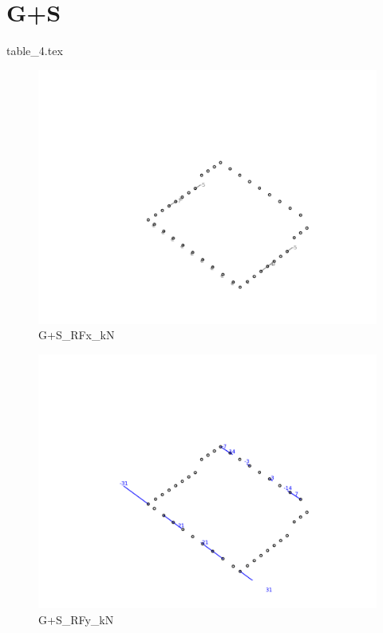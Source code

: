 
    \section{G+S}
    {table_4.tex}

    \begin{figure}[H] %
        \centering %
        \includegraphics[width=\textwidth]{assets/img/graph3D_charges_cas_4_RFx_kN.png} %
        \caption{G+S\_RFx\_kN} %
    \end{figure}

    \begin{figure}[H] %
        \centering %
        \includegraphics[width=\textwidth]{assets/img/graph3D_charges_cas_4_RFy_kN.png} %
        \caption{G+S\_RFy\_kN} %
    \end{figure}

